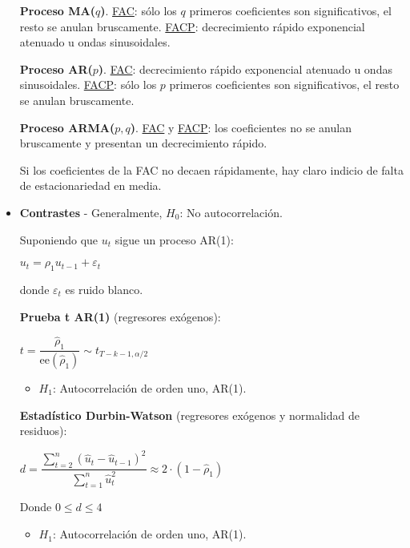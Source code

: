\documentclass[10pt, a4paper, landscape]{article}
\newcommand{\se}{\mathrm{ee}}
\begin{document}
\begin{multicols}{3}
\begin{itemize}[leftmargin=*]
			\textbf{Proceso MA($q$)}. \underline{FAC}: sólo los $q$ primeros coeficientes son significativos, el resto se anulan bruscamente. \underline{FACP}: decrecimiento rápido exponencial atenuado u ondas sinusoidales.
			
			\textbf{Proceso AR($p$)}. \underline{FAC}: decrecimiento rápido exponencial atenuado u ondas sinusoidales. \underline{FACP}: sólo los $p$ primeros coeficientes son significativos, el resto se anulan bruscamente.
			
			\columnbreak
			
			\textbf{Proceso ARMA($p, q$)}. \underline{FAC} y \underline{FACP}: los coeficientes no se anulan bruscamente y presentan un decrecimiento rápido.

			Si los coeficientes de la FAC no decaen rápidamente, hay claro indicio de falta de estacionariedad en media.
			
			\item \textbf{Contrastes} - Generalmente, $H_{0}$: No autocorrelación.
			
			Suponiendo que $u_{t}$ sigue un proceso AR(1):
			
			\begin{center}
				$u_{t} = \rho_{1} u_{t - 1} + \varepsilon_{t}$
			\end{center}
			
			donde $\varepsilon_{t}$ es ruido blanco.

			\textbf{Prueba t AR(1)} (regresores exógenos):

			\begin{center}
				$t = \dfrac{\hat{\rho}_{1}}{\se(\hat{\rho}_{1})} \sim t_{T - k - 1, \alpha/2}$
			\end{center}

			\begin{itemize}[leftmargin=*]
				\item $H_{1}$: Autocorrelación de orden uno, AR(1).
			\end{itemize}

			\textbf{Estadístico Durbin-Watson} (regresores exógenos y normalidad de residuos):

			\begin{center}
				$d = \dfrac{\sum_{t=2}^{n} (\hat{u}_{t} - \hat{u}_{t - 1})^{2}}{\sum_{t=1}^{n} \hat{u}_{t}^{2}} \approx 2 \cdot (1 - \hat{\rho}_{1})$
			\end{center}
			
			Donde $0 \leq d \leq 4$
			
			\begin{itemize}[leftmargin=*]
				\item $H_{1}$: Autocorrelación de orden uno, AR(1).
			\end{itemize}
			

\end{itemize}
\end{multicols}
\end{document}
